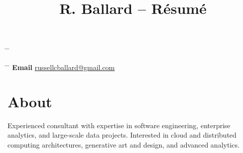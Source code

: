\documentclass[10pt]{article} %
\begin{document}

\title{R. Ballard -- Résumé} %


\parbox{0.5\textwidth}{ %
\begin{tabbing} %
\hspace{3cm} \= \hspace{4cm} \= \kill %
\end{tabbing}}
\hfill %
\parbox{0.5\textwidth}{ %
\begin{tabbing} %
\hspace{3cm} \= \hspace{4cm} \= \kill %
{\bf Email} \> \href{mailto:russellcballard@gmail.com}{russellcballard@gmail.com} \\ %
\end{tabbing}}


\section{About}

Experienced consultant with expertise in software engineering, enterprise analytics, and large-scale data projects.
Interested in cloud and distributed computing architectures, generative art and design, and advanced analytics.

\end{document}
